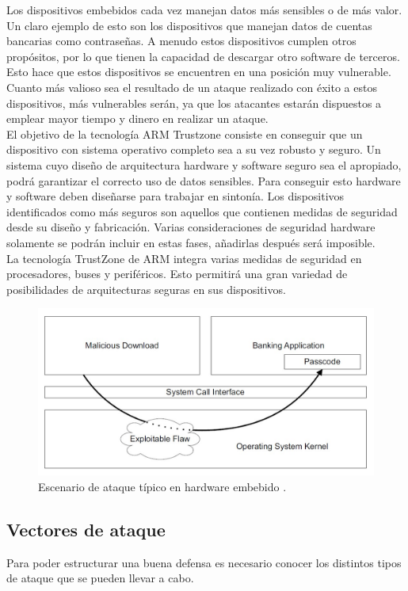 Los dispositivos embebidos cada vez manejan datos más sensibles o de más valor. Un claro ejemplo de esto son los dispositivos que manejan datos de cuentas bancarias como contraseñas. A menudo estos dispositivos cumplen otros propósitos, por lo que tienen la capacidad de descargar otro software de terceros. Esto hace que estos dispositivos se encuentren en una posición muy vulnerable. Cuanto más valioso sea el resultado de un ataque realizado con éxito a estos dispositivos, más vulnerables serán, ya que los atacantes estarán dispuestos a emplear mayor tiempo y dinero en realizar un ataque. \\
El objetivo de la tecnología ARM Trustzone consiste en conseguir que un dispositivo con sistema operativo completo sea a su vez robusto y seguro. Un sistema cuyo diseño de arquitectura hardware y software seguro sea el apropiado, podrá garantizar el correcto uso de datos sensibles. Para conseguir esto hardware y software deben diseñarse para trabajar en sintonía. Los dispositivos identificados como más seguros son aquellos que contienen medidas de seguridad desde su diseño y fabricación. Varias consideraciones de seguridad hardware solamente se podrán incluir en estas fases, añadirlas después será imposible. \\
La tecnología TrustZone de ARM integra varias medidas de seguridad en procesadores, buses y periféricos. Esto permitirá una gran variedad de posibilidades de arquitecturas seguras en sus dispositivos.


\begin{figure}
	\centering
	\includegraphics[width=1\textwidth]{imagenes/ataque.jpg}
	\caption{\label{fig1}Escenario de ataque típico en hardware embebido \cite{trustzone}.}
\end{figure}

\subsection{Vectores de ataque}
Para poder estructurar una buena defensa es necesario conocer los distintos tipos de ataque que se pueden llevar a cabo.

